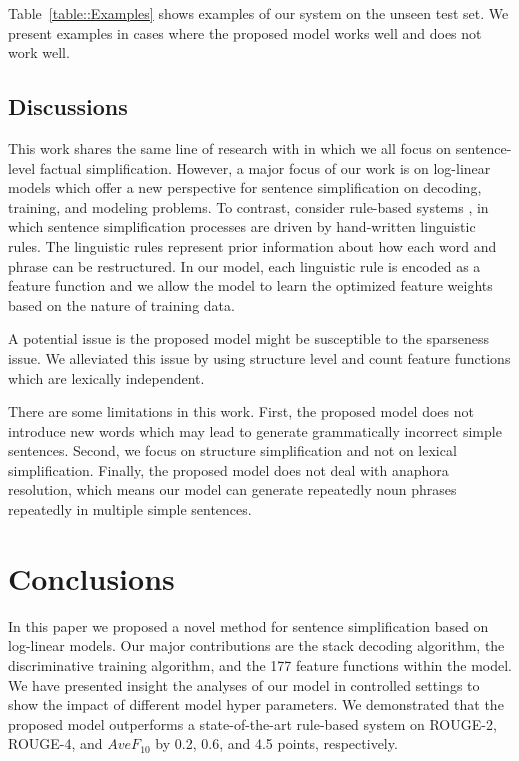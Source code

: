 \documentclass[10pt]{article}
\begin{document}
Table~\ref{table::Examples} shows examples of our system on the unseen test set. 
We present examples in cases where the proposed model works well and does not work well.



\subsection{Discussions}

This work shares the same line of research with \cite{Klebanov:2004,HeilmanSmith:2010} in which we all focus on sentence-level factual simplification.
However, a major focus of our work is on log-linear models which offer a new perspective for sentence simplification on decoding, training, and modeling problems.
To contrast, consider rule-based systems \cite{Klebanov:2004,Daelemans-et-al:2004,Siddharthan:2006,HeilmanSmith:2010}, in which sentence simplification processes are driven by hand-written linguistic rules. 
The linguistic rules represent prior information about how each word and phrase can be restructured.
In our model, each linguistic rule is encoded as a feature function and we allow the model to learn the optimized feature weights based on the nature of training data.

A potential issue is the proposed model might be susceptible to the sparseness issue. 
We alleviated this issue by using structure level and count feature functions which are lexically independent. 

There are some limitations in this work.
First, the proposed model does not introduce new words which may lead to generate grammatically incorrect simple sentences.
Second, we focus on structure simplification and not on lexical simplification.
Finally, the proposed model does not deal with anaphora resolution, which means our model can generate repeatedly noun phrases repeatedly in multiple simple sentences.

\section{Conclusions}
\label{sec:Conclusion}

In this paper we proposed a novel method for sentence simplification based on log-linear models.
Our major contributions are the stack decoding algorithm, the discriminative training algorithm, and the 177 feature functions within the model.
We have presented insight the analyses of our model in controlled settings to show the impact of different model hyper parameters.
We demonstrated that the proposed model outperforms a state-of-the-art rule-based system on ROUGE-2, ROUGE-4, and $AveF_{10}$ by 0.2, 0.6, and 4.5 points, respectively.
\end{document}
